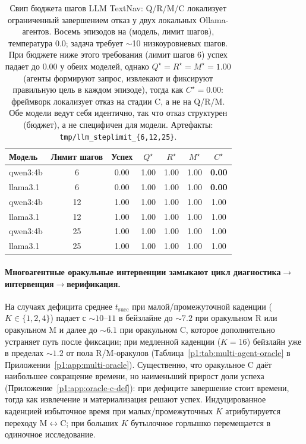 \documentclass{article}
\begin{document}
\begin{table}[h]
  \caption{Свип бюджета шагов LLM TextNav: Q/R/M/C локализует ограниченный завершением отказ у двух локальных Ollama-агентов. Восемь эпизодов на (модель, лимит шагов), температура 0.0; задача требует $\sim$10 низкоуровневых шагов. При бюджете ниже этого требования (лимит шагов 6) успех падает до $0.00$ у обеих моделей, однако $Q^\star{=}R^\star{=}M^\star{=}1.00$ (агенты формируют запрос, извлекают и фиксируют правильную цель в каждом эпизоде), тогда как $C^\star{=}0.00$: фреймворк локализует отказ на стадии C, а не на Q/R/M. Обе модели ведут себя идентично, так что отказ структурен (бюджет), а не специфичен для модели. Артефакты: \texttt{tmp/llm\_steplimit\_\{6,12,25\}}.}
  \label{p1:tab:llm-smoke}
  \centering
  \small
  \begin{tabular}{l c c c c c c}
    \toprule
    Модель & Лимит шагов & Успех & $Q^\star$ & $R^\star$ & $M^\star$ & $C^\star$ \\
    \midrule
    qwen3:4b & 6  & 0.00 & 1.00 & 1.00 & 1.00 & \textbf{0.00} \\
    llama3.1 & 6  & 0.00 & 1.00 & 1.00 & 1.00 & \textbf{0.00} \\
    \midrule
    qwen3:4b & 12 & 1.00 & 1.00 & 1.00 & 1.00 & 1.00 \\
    llama3.1 & 12 & 1.00 & 1.00 & 1.00 & 1.00 & 1.00 \\
    qwen3:4b & 25 & 1.00 & 1.00 & 1.00 & 1.00 & 1.00 \\
    llama3.1 & 25 & 1.00 & 1.00 & 1.00 & 1.00 & 1.00 \\
    \bottomrule
  \end{tabular}
\end{table}

\paragraph{Многоагентные оракульные интервенции замыкают цикл диагностика$\to$интервенция$\to$верификация.}
На случаях дефицита среднее $t_{\mathrm{succ}}$ при малой/промежуточной каденции ($K{\in}\{1,2,4\}$) падает с $\sim10$--$11$ в бейзлайне до $\sim7.2$ при оракульном R или оракульном M и далее до $\sim6.1$ при оракульном C, которое дополнительно устраняет путь после фиксации; при медленной каденции ($K{=}16$) бейзлайн уже в пределах $\sim1.2$ от пола R/M-оракулов (Таблица~\ref{p1:tab:multi-agent-oracle} в Приложении~\ref{p1:app:multi-oracle}). Существенно, что оракульное C даёт наибольшее сокращение времени, но наименьший прирост доли успеха (Приложение~\ref{p1:app:oracle-c-def}): при дефиците завершение стоит времени, тогда как извлечение и материализация решают успех. Индуцированное каденцией избыточное время при малых/промежуточных $K$ атрибутируется переходу M$\leftrightarrow$C; при больших $K$ бутылочное горлышко перемещается в одиночное исследование.
\end{document}
